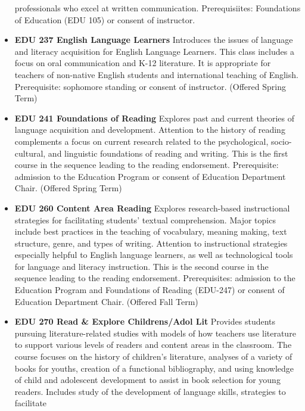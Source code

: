 \documentclass[
  letterpaper,
]{scrbook}
\begin{document}
\begin{itemize}
  professionals who excel at written communication. Prerequisiites:
  Foundations of Education (EDU 105) or consent of instructor.\\
\item
  \textbf{EDU 237 English Language Learners} Introduces the issues of
  language and literacy acquisition for English Language Learners. This
  class includes a focus on oral communication and K-12 literature. It
  is appropriate for teachers of non-native English students and
  international teaching of English. Prerequisite: sophomore standing or
  consent of instructor. (Offered Spring Term)\\
\item
  \textbf{EDU 241 Foundations of Reading} Explores past and current
  theories of language acquisition and development. Attention to the
  history of reading complements a focus on current research related to
  the psychological, socio-cultural, and linguistic foundations of
  reading and writing. This is the first course in the sequence leading
  to the reading endorsement. Prerequisite: admission to the Education
  Program or consent of Education Department Chair. (Offered Spring
  Term)\\
\item
  \textbf{EDU 260 Content Area Reading} Explores research-based
  instructional strategies for facilitating students' textual
  comprehension. Major topics include best practices in the teaching of
  vocabulary, meaning making, text structure, genre, and types of
  writing. Attention to instructional strategies especially helpful to
  English language learners, as well as technological tools for language
  and literacy instruction. This is the second course in the sequence
  leading to the reading endorsement. Prerequisites: admission to the
  Education Program and Foundations of Reading (EDU-247) or consent of
  Education Department Chair. (Offered Fall Term)\\
\item
  \textbf{EDU 270 Read \& Explore Childrens/Adol Lit} Provides students
  pursuing literature-related studies with models of how teachers use
  literature to support various levels of readers and content areas in
  the classroom. The course focuses on the history of children's
  literature, analyses of a variety of books for youths, creation of a
  functional bibliography, and using knowledge of child and adolescent
  development to assist in book selection for young readers. Includes
  study of the development of language skills, strategies to facilitate

\end{itemize}
\end{document}
